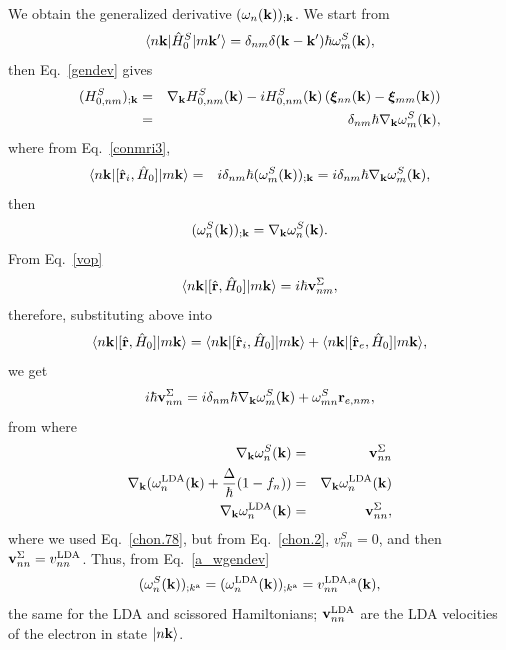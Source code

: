\documentclass[floatfix,prb,aps,superscriptaddress,11pt,preprint]{revtex4}
\begin{document}
We obtain the
generalized derivative $(\omega_n(\mathbf{k}))_{;\mathbf{k}}$.
We start from
\begin{equation}\label{a_conH0}
\langle n\mathbf{k} |\hat{H}^S_0| m\mathbf{k}' \rangle=\delta_{nm}\delta(\mathbf{k}-\mathbf{k}')\hbar\omega^S_m(\mathbf{k})
,
\end{equation}
then Eq.~\eqref{gendev} gives
\begin{eqnarray}\label{a_genderH0}
(H^S_{0,nm})_{;\mathbf{k}}&=&
\nabla_{\mathbf{k}}
H^S_{0,n m}(\mathbf{k})
-
i
H^S_{0,nm}(\mathbf{k})
\left(
\boldsymbol{\xi}_{nn}(\mathbf{k})
-
\boldsymbol{\xi}_{mm}(\mathbf{k})
\right)
\nonumber\\
&=&\delta_{nm}\hbar\nabla_{\mathbf{k}}\omega^S_m(\mathbf{k})
,
\end{eqnarray}
where from Eq.~\eqref{conmri3}, 
\begin{eqnarray}\label{a_rih0}
\langle n\mathbf{k} |[\hat{\mathbf{r}}_i,\hat{H}_0]| m\mathbf{k} \rangle&=&
i\delta_{nm}\hbar(\omega^S_m(\mathbf{k}))_{;\mathbf{k}}
=
i\delta_{nm}\hbar\nabla_{\mathbf{k}}\omega^S_m(\mathbf{k})
,
\end{eqnarray}
then
\begin{equation}\label{a_wgendev}
(\omega^S_n(\mathbf{k}))_{;\mathbf{k}}=
\nabla_{\mathbf{k}}\omega^S_n(\mathbf{k})
.
\end{equation}
From Eq.~\eqref{vop} 
\begin{equation}\label{a_hr}
\langle n\mathbf{k} |[\hat{\mathbf{r}},\hat{H}_0]| m\mathbf{k} \rangle=
i\hbar\mathbf{v}^\Sigma_{nm}
,
\end{equation}
therefore, substituting above into
\begin{equation}\label{a_hrt}
\langle n\mathbf{k} |[\hat{\mathbf{r}},\hat{H}_0]| m\mathbf{k} \rangle=
\langle n\mathbf{k} |[\hat{\mathbf{r}}_i,\hat{H}_0]| m\mathbf{k} \rangle
+
\langle n\mathbf{k} |[\hat{\mathbf{r}}_e,\hat{H}_0]| m\mathbf{k} \rangle
,
\end{equation}
we get
\begin{equation}\label{a_hrt2}
i\hbar\mathbf{v}^\Sigma_{nm}=
i\delta_{nm}\hbar\nabla_{\mathbf{k}}\omega^S_m(\mathbf{k})
+
\omega^S_{mn}\mathbf{r}_{e,nm}
,
\end{equation}
from where
\begin{eqnarray}\label{a_gradw}
\nabla_{\mathbf{k}}\omega^S_n(\mathbf{k})
&=&
\mathbf{v}^\Sigma_{nn}
\nonumber\\
\nabla_{\mathbf{k}}(\omega^{\mathrm{LDA}}_n(\mathbf{k})+\frac{\Delta}{\hbar}(1-f_n))
&=&
\nabla_{\mathbf{k}}\omega^{\mathrm{LDA}}_n(\mathbf{k})
\nonumber\\
\nabla_{\mathbf{k}}\omega^{\mathrm{LDA}}_n(\mathbf{k})
&=&
\mathbf{v}^\Sigma_{nn}
,
\end{eqnarray}
where we used Eq.~\eqref{chon.78},
but from 
Eq.~\eqref{chon.2}, $v^S_{nn}=0$, and then
$\mathbf{v}^\Sigma_{nn}=v^{\mathrm{LDA}}_{nn}$.
Thus,  from Eq.~\eqref{a_wgendev}
\begin{equation}\label{a_gradw2}
(\omega^S_n(\mathbf{k}))_{;k^{\mathrm{a}}}=
(\omega^{\mathrm{LDA}}_n(\mathbf{k}))_{;k^{\mathrm{a}}}=
v^{\mathrm{LDA},\mathrm{a}}_{nn}(\mathbf{k})
,
\end{equation}
the same for the LDA and scissored Hamiltonians; $\mathbf{v}_{nn}^{\mathrm{LDA}}$ are
the LDA velocities of the electron in state $| n\mathbf{k} \rangle$.
\end{document}
